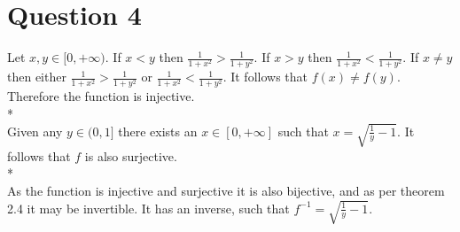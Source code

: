 \documentclass[a4paper,12pt]{article}
\begin{document}
\section{Question 4}
Let $x,y \in [0,+\infty)$. If $x < y$ then $\frac{1}{1 + x^2} > \frac{1}{1 + y^2}$. 
If $x > y$ then $\frac{1}{1 + x^2} < \frac{1}{1 + y^2}$. If $x \not= y$ then either 
$\frac{1}{1 + x^2} > \frac{1}{1 + y^2}$ or $\frac{1}{1 + x^2} < \frac{1}{1 + y^2}$. It follows that $f(x) \not= f(y)$.
Therefore the function is injective.
\\*
\\
Given any $y \in (0,1]$ there exists an $x \in [0,+\infty]$ such that $x = \sqrt{\frac{1}{y} -1}$.
It follows that $f$ is also surjective.
\\*
\\
As the function is injective and surjective it is also bijective, and as per theorem 2.4 it may be invertible.
It has an inverse, such that $f^{-1} =  \sqrt{\frac{1}{y} -1}$.
\end{document}
